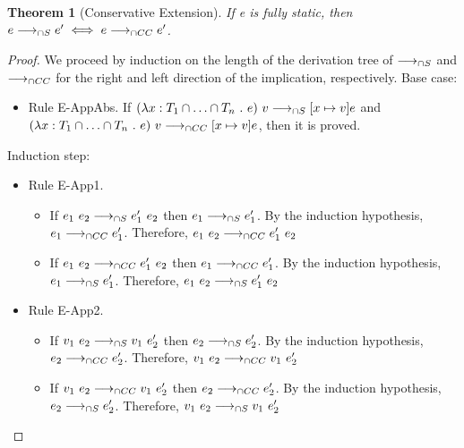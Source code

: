 \documentclass[a4paper]{article}
\newtheorem{theorem}{Theorem}
\begin{document}
\begin{theorem}[Conservative Extension]
\label{conservative_extension_operationalsemantics}
If e is fully static, then $e \longrightarrow_{\cap S} e' \iff e \longrightarrow_{\cap CC} e'$.
\end{theorem}
\begin{proof}
We proceed by induction on the length of the derivation tree of $\longrightarrow_{\cap S}$ and $\longrightarrow_{\cap CC}$ for the right and left direction of the implication, respectively.
Base case:
\begin{itemize}
    \item Rule E-AppAbs.
    If $(\lambda x : T_1 \cap \ldots \cap T_n\ .\ e)\ v \longrightarrow_{\cap S} [x \mapsto v]e$ and $(\lambda x : T_1 \cap \ldots \cap T_n\ .\ e)\ v \longrightarrow_{\cap CC} [x \mapsto v]e$, then it is proved.
\end{itemize}
Induction step:
\begin{itemize}
    \item Rule E-App1.
    \begin{itemize}
        \item If $e_1\ e_2 \sios e_1'\ e_2$ then $e_1 \longrightarrow_{\cap S} e_1'$.
        By the induction hypothesis, $e_1 \longrightarrow_{\cap CC} e_1'$.
        Therefore, $e_1\ e_2 \gios e_1'\ e_2$
        \item If $e_1\ e_2 \gios e_1'\ e_2$ then $e_1 \longrightarrow_{\cap CC} e_1'$.
        By the induction hypothesis, $e_1 \longrightarrow_{\cap S} e_1'$.
        Therefore, $e_1\ e_2 \sios e_1'\ e_2$
    \end{itemize}
    \item Rule E-App2.
    \begin{itemize}
        \item If $v_1\ e_2 \sios v_1\ e_2'$ then $e_2 \longrightarrow_{\cap S} e_2'$.
        By the induction hypothesis, $e_2 \longrightarrow_{\cap CC} e_2'$.
        Therefore, $v_1\ e_2 \gios v_1\ e_2'$
        \item If $v_1\ e_2 \gios v_1\ e_2'$ then $e_2 \longrightarrow_{\cap CC} e_2'$.
        By the induction hypothesis, $e_2 \longrightarrow_{\cap S} e_2'$.
        Therefore, $v_1\ e_2 \sios v_1\ e_2'$
    \end{itemize}
\end{itemize}
\end{proof}
\end{document}
